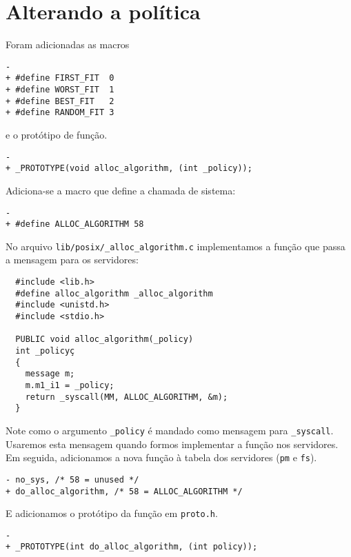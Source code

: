 \documentclass{amsart}
\theoremstyle{plain}
\newcommand{\code}[1]{\lstinline[mathescape=true]{#1}}
\begin{document}
\section{Alterando a política}

Foram adicionadas as macros

\begin{lstlisting}[frame=leftline,mathescape=true,style=nonumbers]
-
+ #define FIRST_FIT  0
+ #define WORST_FIT  1
+ #define BEST_FIT   2
+ #define RANDOM_FIT 3
\end{lstlisting}
e o protótipo de função.
\begin{lstlisting}[frame=leftline,mathescape=true,style=nonumbers]
-
+ _PROTOTYPE(void alloc_algorithm, (int _policy));
\end{lstlisting}

Adiciona-se a macro que define a chamada de sistema:

\begin{lstlisting}[frame=leftline,mathescape=true,style=nonumbers]
-
+ #define ALLOC_ALGORITHM 58
\end{lstlisting}

No arquivo \code{lib/posix/_alloc_algorithm.c} implementamos a função que passa a mensagem para os
servidores:

\begin{verbatim}
  #include <lib.h>
  #define alloc_algorithm _alloc_algorithm
  #include <unistd.h>
  #include <stdio.h>

  PUBLIC void alloc_algorithm(_policy)
  int _policyç
  {
    message m;
    m.m1_i1 = _policy;
    return _syscall(MM, ALLOC_ALGORITHM, &m);
  }
\end{verbatim}

Note como o argumento \code{_policy} é mandado como mensagem para \code{_syscall}. Usaremos esta
mensagem quando formos implementar a função nos servidores. Em seguida, adicionamos a nova função à
tabela dos servidores (\code{pm} e \code{fs}).

\begin{lstlisting}[frame=leftline,mathescape=true,style=nonumbers]
- no_sys, /* 58 = unused */
+ do_alloc_algorithm, /* 58 = ALLOC_ALGORITHM */
\end{lstlisting}

E adicionamos o protótipo da função em \code{proto.h}.

\begin{lstlisting}[frame=leftline,mathescape=true,style=nonumbers]
-
+ _PROTOTYPE(int do_alloc_algorithm, (int policy));
\end{lstlisting}
\end{document}
